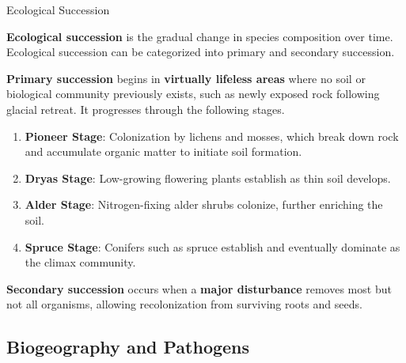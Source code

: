 \documentclass[10pt]{article}
\begin{document}
    \begin{core}{Ecological Succession}

      \textbf{Ecological succession} is the gradual change in species composition over time. Ecological succession can be categorized into primary and secondary succession.

      \textbf{Primary succession} begins in \textbf{virtually lifeless areas} where no soil or biological community previously exists, such as newly exposed rock following glacial retreat. It progresses through the following stages.


      \begin{enumerate}

        \item \textbf{Pioneer Stage}: Colonization by lichens and mosses, which break down rock and accumulate organic matter to initiate soil formation.

        \item \textbf{Dryas Stage}: Low-growing flowering plants establish as thin soil develops.

        \item \textbf{Alder Stage}: Nitrogen-fixing alder shrubs colonize, further enriching the soil.

        \item \textbf{Spruce Stage}: Conifers such as spruce establish and eventually dominate as the climax community.

      \end{enumerate}

      \textbf{Secondary succession} occurs when a \textbf{major disturbance} removes most but not all organisms, allowing recolonization from surviving roots and seeds.


    \end{core}

  \subsection{Biogeography and Pathogens}
\end{document}
